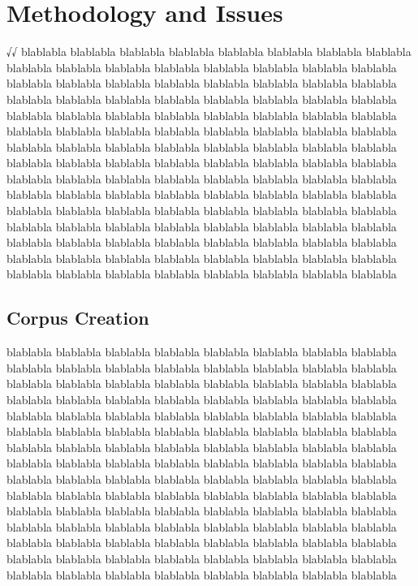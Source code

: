 \documentclass[12pt]{article}
\begin{document}
\section {Methodology and Issues}

√√
blablabla blablabla blablabla 
blablabla blablabla blablabla 
blablabla blablabla blablabla 
blablabla blablabla blablabla 
blablabla blablabla blablabla 
blablabla blablabla blablabla 
blablabla blablabla blablabla 
blablabla blablabla blablabla 
blablabla blablabla blablabla 
blablabla blablabla blablabla 
blablabla blablabla blablabla 
blablabla blablabla blablabla 
blablabla blablabla blablabla 
blablabla blablabla blablabla 
blablabla blablabla blablabla 
blablabla blablabla blablabla 
blablabla blablabla blablabla 
blablabla blablabla blablabla 
blablabla blablabla blablabla 
blablabla blablabla blablabla 
blablabla blablabla blablabla 
blablabla blablabla blablabla 
blablabla blablabla blablabla 
blablabla blablabla blablabla 
blablabla blablabla blablabla 
blablabla blablabla blablabla 
blablabla blablabla blablabla 
blablabla blablabla blablabla 
blablabla blablabla blablabla 
blablabla blablabla blablabla 
blablabla blablabla blablabla 
blablabla blablabla blablabla 
blablabla blablabla blablabla 
blablabla blablabla blablabla 
blablabla blablabla blablabla 
blablabla blablabla blablabla 
blablabla blablabla blablabla 
blablabla blablabla blablabla 
blablabla blablabla blablabla 
blablabla blablabla blablabla 

\subsection{Corpus Creation}


blablabla blablabla blablabla 
blablabla blablabla blablabla 
blablabla blablabla blablabla 
blablabla blablabla blablabla 
blablabla blablabla blablabla 
blablabla blablabla blablabla 
blablabla blablabla blablabla 
blablabla blablabla blablabla 
blablabla blablabla blablabla 
blablabla blablabla blablabla 
blablabla blablabla blablabla 
blablabla blablabla blablabla 
blablabla blablabla blablabla 
blablabla blablabla blablabla 
blablabla blablabla blablabla 
blablabla blablabla blablabla 
blablabla blablabla blablabla 
blablabla blablabla blablabla 
blablabla blablabla blablabla 
blablabla blablabla blablabla 
blablabla blablabla blablabla 
blablabla blablabla blablabla 
blablabla blablabla blablabla 
blablabla blablabla blablabla 
blablabla blablabla blablabla 
blablabla blablabla blablabla 
blablabla blablabla blablabla 
blablabla blablabla blablabla 
blablabla blablabla blablabla 
blablabla blablabla blablabla 
blablabla blablabla blablabla 
blablabla blablabla blablabla 
blablabla blablabla blablabla 
blablabla blablabla blablabla 
blablabla blablabla blablabla 
blablabla blablabla blablabla 
blablabla blablabla blablabla 
blablabla blablabla blablabla 
blablabla blablabla blablabla 
blablabla blablabla blablabla 
\end{document}
